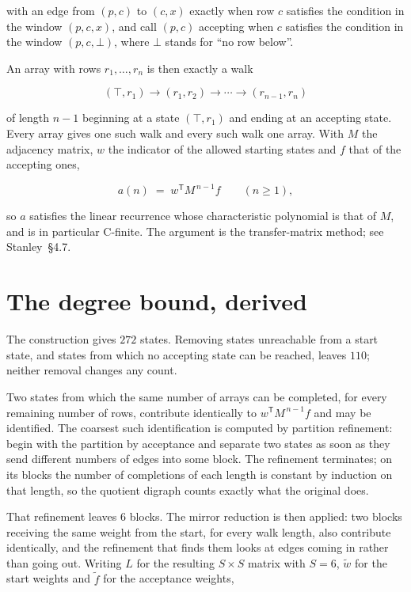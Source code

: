 \documentclass[11pt]{article}
\theoremstyle{definition}
\begin{document}
with an edge from $(p,c)$ to $(c,x)$ exactly when row $c$ satisfies the condition in the window $(p,c,x)$, and call $(p,c)$ accepting when $c$ satisfies the condition in the window $(p,c,\bot)$, where $\bot$ stands for ``no row below''.

An array with rows $r_1,\dots,r_n$ is then exactly a walk

\[(\top,r_1) \to (r_1,r_2) \to \cdots \to (r_{n-1},r_n)\]

of length $n-1$ beginning at a state $(\top,r_1)$ and ending at an accepting state. Every array gives one such walk and every such walk one array. With $M$ the adjacency matrix, $w$ the indicator of the allowed starting states and $f$ that of the accepting ones,

\[a(n) \;=\; w^{\mathsf T} M^{\,n-1} f \qquad (n \ge 1),\]

so $a$ satisfies the linear recurrence whose characteristic polynomial is that of $M$, and is in particular C-finite. The argument is the transfer-matrix method; see Stanley~\S4.7.

\section{The degree bound, derived}

The construction gives $272$ states. Removing states unreachable from a start state, and states from which no accepting state can be reached, leaves $110$; neither removal changes any count.

Two states from which the same number of arrays can be completed, for every remaining number of rows, contribute identically to $w^{\mathsf T}M^{\,n-1}f$ and may be identified. The coarsest such identification is computed by partition refinement: begin with the partition by acceptance and separate two states as soon as they send different numbers of edges into some block. The refinement terminates; on its blocks the number of completions of each length is constant by induction on that length, so the quotient digraph counts exactly what the original does.

That refinement leaves $6$ blocks. The mirror reduction is then applied: two blocks receiving the same weight from the start, for every walk length, also contribute identically, and the refinement that finds them looks at edges coming in rather than going out. Writing $L$ for the resulting $S \times S$ matrix with $S = 6$, $\tilde w$ for the start weights and $\tilde f$ for the acceptance weights,
\end{document}
